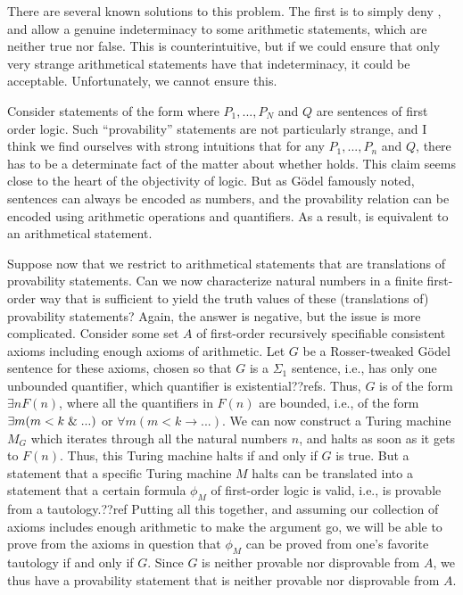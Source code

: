 There are several known solutions to this problem. The first is to simply deny , and allow a genuine 
indeterminacy to some arithmetic statements, which are neither true nor false. This is counterintuitive, but if we could 
ensure that only very strange arithmetical statements have that indeterminacy, it could be acceptable. Unfortunately, we 
cannot ensure this. 

Consider statements of the form
where $P_1,...,P_N$ and $Q$ 
are sentences of first order logic. Such ``provability'' statements are not particularly strange, and I think we find ourselves
with strong intuitions that for any $P_1,...,P_n$ and $Q$, there has to be a determinate fact of the matter about whether 
 holds. This claim seems close to the heart of the objectivity of logic. But as G\"odel famously noted, sentences
can always be encoded as numbers, and the provability relation can be encoded using arithmetic operations and quantifiers. 
As a result,  is equivalent to an arithmetical statement. 

Suppose now that we restrict  to arithmetical statements that are translations of provability statements.
Can we now characterize natural numbers in a finite first-order way that is sufficient to yield the truth values of these 
(translations of) provability statements? Again, the answer is negative, but the issue is more complicated. Consider some 
set $A$ of first-order recursively specifiable consistent axioms including enough axioms of arithmetic. Let $G$ be a Rosser-tweaked
G\"odel sentence for these axioms, chosen so that $G$ is a $\Sigma_1$ sentence, i.e., has only one unbounded quantifier, 
which quantifier is existential??refs. Thus, $G$ is of the form $\exists n F(n)$, where all the quantifiers in $F(n)$ are 
bounded, i.e., of the form $\exists m (m<k \mathrel{\&} ...)$ or $\forall m(m<k \rightarrow ...)$. We can now construct a Turing
machine $M_G$ which iterates through all the natural numbers $n$, and halts as soon as it gets to $F(n)$. Thus, this Turing machine
halts if and only if $G$ is true. But a statement that a specific Turing machine $M$ halts can be translated into a statement
that a certain formula $\phi_M$ of first-order logic is valid, i.e., is provable from a tautology.??ref Putting all this together,
and assuming our collection of axioms includes enough arithmetic to make the argument go, we will be able to prove from the 
axioms in question that $\phi_M$ can be proved from one's favorite tautology if and only if $G$. Since $G$ is neither 
provable nor disprovable from $A$, we thus have a provability statement that is neither provable nor disprovable
from $A$.

